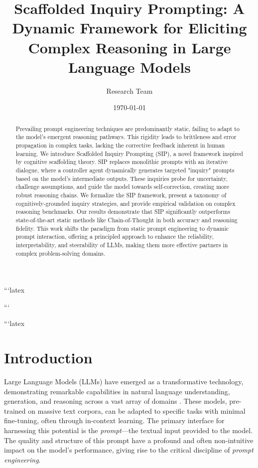 \documentclass{article}
\begin{document}
```latex
\title{Scaffolded Inquiry Prompting: A Dynamic Framework for Eliciting Complex Reasoning in Large Language Models}
\author{Research Team}
\date{\today}

\begin{abstract}
Prevailing prompt engineering techniques are predominantly static, failing to adapt to the model's emergent reasoning pathways. This rigidity leads to brittleness and error propagation in complex tasks, lacking the corrective feedback inherent in human learning. We introduce Scaffolded Inquiry Prompting (SIP), a novel framework inspired by cognitive scaffolding theory. SIP replaces monolithic prompts with an iterative dialogue, where a controller agent dynamically generates targeted "inquiry" prompts based on the model's intermediate outputs. These inquiries probe for uncertainty, challenge assumptions, and guide the model towards self-correction, creating more robust reasoning chains. We formalize the SIP framework, present a taxonomy of cognitively-grounded inquiry strategies, and provide empirical validation on complex reasoning benchmarks. Our results demonstrate that SIP significantly outperforms state-of-the-art static methods like Chain-of-Thought in both accuracy and reasoning fidelity. This work shifts the paradigm from static prompt engineering to dynamic prompt interaction, offering a principled approach to enhance the reliability, interpretability, and steerability of LLMs, making them more effective partners in complex problem-solving domains.
\end{abstract}
```

\maketitle

```latex
\section{Introduction}

Large Language Models (LLMs) have emerged as a transformative technology, demonstrating remarkable capabilities in natural language understanding, generation, and reasoning across a vast array of domains \cite{brown2020language, touvron2023llama}. These models, pre-trained on massive text corpora, can be adapted to specific tasks with minimal fine-tuning, often through in-context learning. The primary interface for harnessing this potential is the \textit{prompt}---the textual input provided to the model. The quality and structure of this prompt have a profound and often non-intuitive impact on the model's performance, giving rise to the critical discipline of \textit{prompt engineering}.
\end{document}
